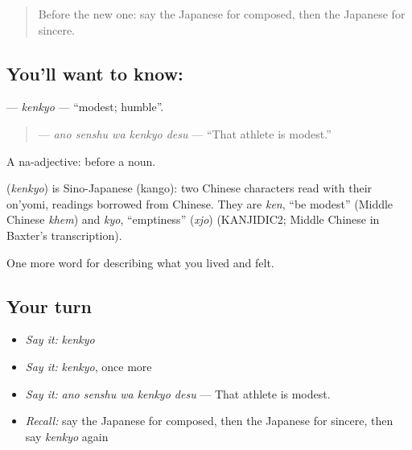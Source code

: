 \label{lesson:JA-C437-kenkyo}



\begin{quote}
Before the new one: say the Japanese for composed, then the Japanese for sincere.
\end{quote}

\subsection*{You'll want to know: }
\textbf{} — \emph{kenkyo} — \textquotedblleft{}modest; humble\textquotedblright{}.

\begin{quote}
\textbf{  } — \emph{ano senshu wa kenkyo desu} — \textquotedblleft{}That athlete is modest.\textquotedblright{}
\end{quote}

A na-adjective:  before a noun.

\begin{cousinweb}
\textbf{} (\emph{kenkyo}) is Sino-Japanese (kango): two Chinese characters read with their on'yomi, readings borrowed from Chinese. They are \emph{ken}, \textquotedblleft{}be modest\textquotedblright{} (Middle Chinese \emph{khem}) and \emph{kyo}, \textquotedblleft{}emptiness\textquotedblright{} (\emph{xjo}) (KANJIDIC2; Middle Chinese in Baxter's transcription).
\end{cousinweb}

\begin{grammarlens}[title={What you've built}]
One more word for describing what you lived and felt.
\end{grammarlens}

\subsection*{Your turn}
\begin{itemize}
\raggedright
  \item \emph{Say it:} \emph{kenkyo}
  \item \emph{Say it:} \emph{kenkyo}, once more
  \item \emph{Say it:} \emph{ano senshu wa kenkyo desu} — That athlete is modest.
  \item \emph{Recall:} say the Japanese for composed, then the Japanese for sincere, then say \emph{kenkyo} again
\end{itemize}

